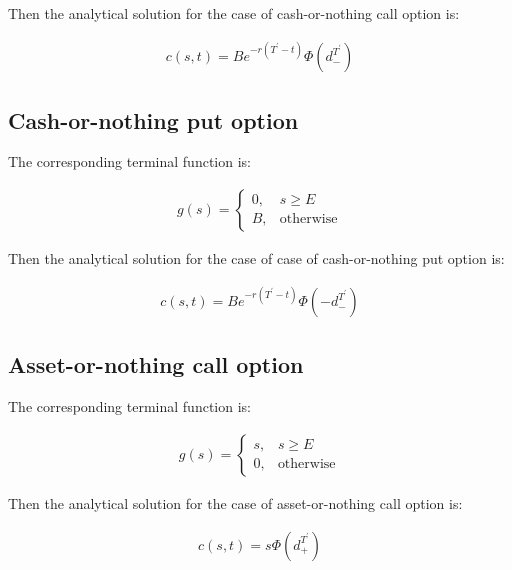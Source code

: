 \documentclass[11pt,a4paper]{extarticle}
\begin{document}
Then the analytical solution for the case of cash-or-nothing call option is:

\begin{equation}
    \begin{aligned}
    c(s,t) = Be^{-r(T^\prime-t)}\Phi(d_{-}^{T^\prime})
    \end{aligned}
    \end{equation}

\subsection{Cash-or-nothing put option}

The corresponding terminal function is:

\begin{equation}
    \begin{aligned}
    g(s)=\begin{cases}0,&s\geq E \\ B,&\text{otherwise}\end{cases}
    \end{aligned}
    \end{equation}

Then the analytical solution for the case of case of cash-or-nothing put option is:

\begin{equation}
    \begin{aligned}
    c(s,t) = Be^{-r(T^\prime-t)}\Phi(-d_{-}^{T^\prime})
    \end{aligned}
    \end{equation}

\subsection{Asset-or-nothing call option}

The corresponding terminal function is:

\begin{equation}
    \begin{aligned}
    g(s)=\begin{cases}s,&s\geq E \\ 0,&\text{otherwise}\end{cases}
    \end{aligned}
    \end{equation}

Then the analytical solution for the case of asset-or-nothing call option is:

\begin{equation}
    \begin{aligned}
    c(s,t) = s\Phi(d_{+}^{T^\prime})
    \end{aligned}
    \end{equation}
\end{document}
